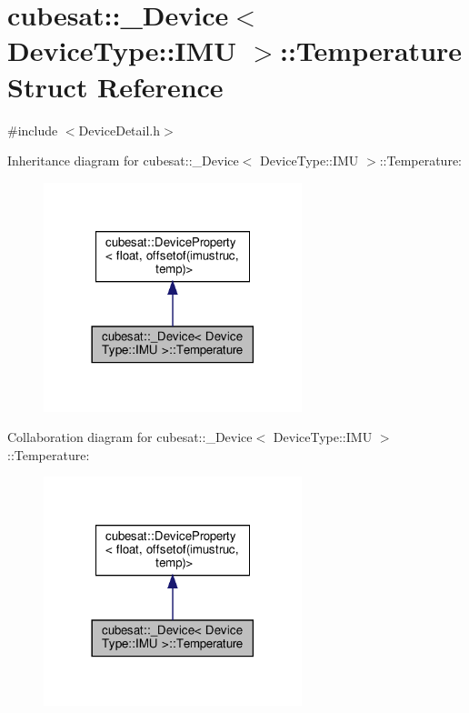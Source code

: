 \hypertarget{structcubesat_1_1__Device_3_01DeviceType_1_1IMU_01_4_1_1Temperature}{}\section{cubesat\+:\+:\+\_\+\+Device$<$ Device\+Type\+:\+:I\+MU $>$\+:\+:Temperature Struct Reference}
\label{structcubesat_1_1__Device_3_01DeviceType_1_1IMU_01_4_1_1Temperature}


{\ttfamily \#include $<$Device\+Detail.\+h$>$}



Inheritance diagram for cubesat\+:\+:\+\_\+\+Device$<$ Device\+Type\+:\+:I\+MU $>$\+:\+:Temperature\+:\nopagebreak
\begin{figure}[H]
\begin{center}
\leavevmode
\includegraphics[width=213pt]{structcubesat_1_1__Device_3_01DeviceType_1_1IMU_01_4_1_1Temperature__inherit__graph}
\end{center}
\end{figure}


Collaboration diagram for cubesat\+:\+:\+\_\+\+Device$<$ Device\+Type\+:\+:I\+MU $>$\+:\+:Temperature\+:\nopagebreak
\begin{figure}[H]
\begin{center}
\leavevmode
\includegraphics[width=213pt]{structcubesat_1_1__Device_3_01DeviceType_1_1IMU_01_4_1_1Temperature__coll__graph}
\end{center}
\end{figure}
